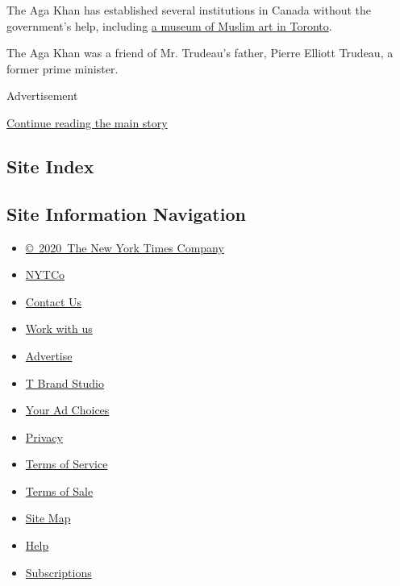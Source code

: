 The Aga Khan has established several institutions in Canada without the
government's help, including
\href{http://www.akdn.org/where-we-work/north-america/canada/aga-khan-museum}{a
museum of Muslim art in Toronto}.

The Aga Khan was a friend of Mr. Trudeau's father, Pierre Elliott
Trudeau, a former prime minister.

Advertisement

\protect\hyperlink{after-bottom}{Continue reading the main story}

\hypertarget{site-index}{%
\subsection{Site Index}\label{site-index}}

\hypertarget{site-information-navigation}{%
\subsection{Site Information
Navigation}\label{site-information-navigation}}

\begin{itemize}
\tightlist
\item
  \href{https://help.nytimes.com/hc/en-us/articles/115014792127-Copyright-notice}{©~2020~The
  New York Times Company}
\end{itemize}

\begin{itemize}
\tightlist
\item
  \href{https://www.nytco.com/}{NYTCo}
\item
  \href{https://help.nytimes.com/hc/en-us/articles/115015385887-Contact-Us}{Contact
  Us}
\item
  \href{https://www.nytco.com/careers/}{Work with us}
\item
  \href{https://nytmediakit.com/}{Advertise}
\item
  \href{http://www.tbrandstudio.com/}{T Brand Studio}
\item
  \href{https://www.nytimes.com/privacy/cookie-policy\#how-do-i-manage-trackers}{Your
  Ad Choices}
\item
  \href{https://www.nytimes.com/privacy}{Privacy}
\item
  \href{https://help.nytimes.com/hc/en-us/articles/115014893428-Terms-of-service}{Terms
  of Service}
\item
  \href{https://help.nytimes.com/hc/en-us/articles/115014893968-Terms-of-sale}{Terms
  of Sale}
\item
  \href{https://spiderbites.nytimes.com}{Site Map}
\item
  \href{https://help.nytimes.com/hc/en-us}{Help}
\item
  \href{https://www.nytimes.com/subscription?campaignId=37WXW}{Subscriptions}
\end{itemize}

